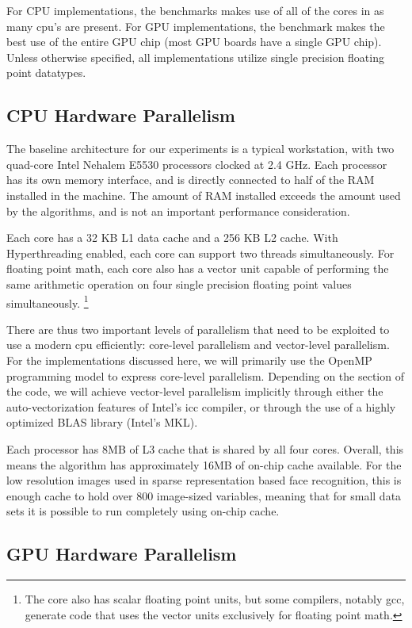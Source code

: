 \documentclass[10pt,twocolumn,letterpaper]{article}
\begin{document}
For CPU implementations, the benchmarks makes use of all of
the cores in as many cpu's are present.  For GPU implementations, the benchmark
makes the best use of the entire GPU chip (most GPU boards have a single GPU
chip).  Unless otherwise specified, all implementations utilize single
precision floating point datatypes.  

\subsection{CPU Hardware Parallelism} 
The baseline architecture for our experiments is a typical workstation,
with two quad-core Intel Nehalem E5530 processors clocked at 2.4 GHz.  Each
processor has its own memory interface, and is directly connected to half of
the RAM installed in the machine.  The amount of RAM installed exceeds the
amount used by the algorithms, and is not an important performance
consideration.  

Each core has a 32 KB L1 data cache and a 256 KB L2 cache. With Hyperthreading
enabled, each core can support two threads simultaneously.  For floating point
math, each core also has a vector unit capable of performing the same
arithmetic operation on four single precision floating point values
simultaneously.  \footnote{The core also has scalar floating point units, but
some compilers, notably gcc, generate code that uses the vector units
exclusively for floating point math.} 

There are thus two important levels of parallelism that need to be exploited to
use a modern cpu efficiently: core-level parallelism and vector-level
parallelism.  For the implementations discussed here, we will primarily use the
OpenMP programming model to express core-level parallelism.  Depending on the
section of the code, we will achieve vector-level parallelism implicitly
through either the auto-vectorization features of Intel's icc compiler, or
through the use of a highly optimized BLAS library (Intel's MKL).

Each processor has 8MB of L3 cache that is shared by all four cores.  Overall,
this means the algorithm has approximately 16MB of on-chip cache available.
For the low resolution images used in sparse representation based face
recognition, this is enough cache to hold over 800 image-sized variables,
meaning that for small data sets it is possible to run completely using on-chip
cache.

\subsection{GPU Hardware Parallelism}
\end{document}
